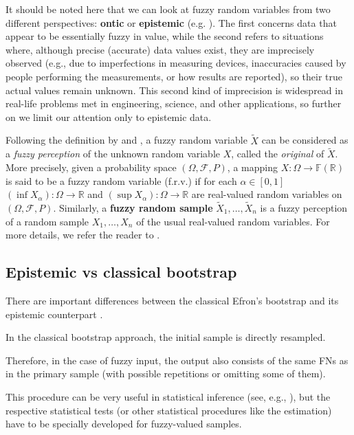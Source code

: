 It should be noted here that we can look at fuzzy random variables from two different perspectives: \textbf{ontic} or \textbf{epistemic} (e.g. \cite{Couso2014}). The first concerns data that appear to be essentially fuzzy in value, while the second refers to situations where, although precise (accurate) data values exist, they are imprecisely observed (e.g., due to imperfections in measuring devices, inaccuracies caused by people performing the measurements, or how results are reported), so their true actual values remain unknown. This second kind of imprecision is widespread in real-life problems met in engineering, science, and other applications, so further on we limit our attention only to epistemic data.

Following the definition by \cite{Kwakernaak} and \cite{Kruse1982}, a fuzzy random variable $\widetilde{X}$ can be considered as a \textit{fuzzy perception} of the unknown random variable $X$, called the \textit{original} of $\widetilde{X}$. More precisely, given a probability space $(\Omega,\mathcal{F},P)$, a mapping $X:\Omega \to\mathbb{F}(\mathbb{R})$ is said to be a fuzzy random variable (f.r.v.) if for each $\alpha\in [0,1]$ $(\inf X_\alpha):\Omega\to\mathbb{R}$ and $(\sup X_\alpha):\Omega\to\mathbb{R}$ are real-valued random variables on $(\Omega,\mathcal{F},P)$. Similarly, a \textbf{fuzzy random sample} $\widetilde{X}_1,\ldots,\widetilde{X}_n$ is a fuzzy perception of a random sample $X_1,\ldots,X_n$ of the usual real-valued random variables. For more details, we refer the reader to \cite{Kwakernaak,Kruse1982}.

\subsection{Epistemic vs classical bootstrap}

There are important differences between the classical Efron's bootstrap \citep{EfroTibs93} and its epistemic counterpart \citep{grzegorzewski2021,pgmr2022,PGMR2024AMS}.

In the classical bootstrap approach, the initial sample is directly resampled.

Therefore, in the case of fuzzy input, the output also consists of the same FNs as in the primary sample (with possible repetitions or omitting some of them).

This procedure can be very useful in statistical inference (see, e.g., \citep{gil,LUBIANO2016918,Montenegro2004}), but the respective statistical tests (or other statistical procedures like the estimation) have to be specially developed for fuzzy-valued samples.

